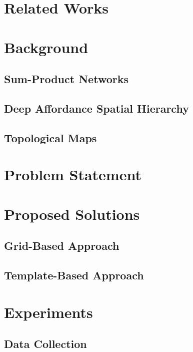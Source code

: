 \documentclass[10pt, titlepage]{article}
\theoremstyle{definition}
\begin{document}
\newpage
\section{Related Works}

\newpage
\section{Background}
\subsection{Sum-Product Networks}
\subsection{Deep Affordance Spatial Hierarchy}
\subsection{Topological Maps}

\newpage
\section{Problem Statement}

\newpage
\section{Proposed Solutions}
\subsection{Grid-Based Approach}
\subsection{Template-Based Approach}

\newpage
\section{Experiments}
\subsection{Data Collection}
\end{document}
